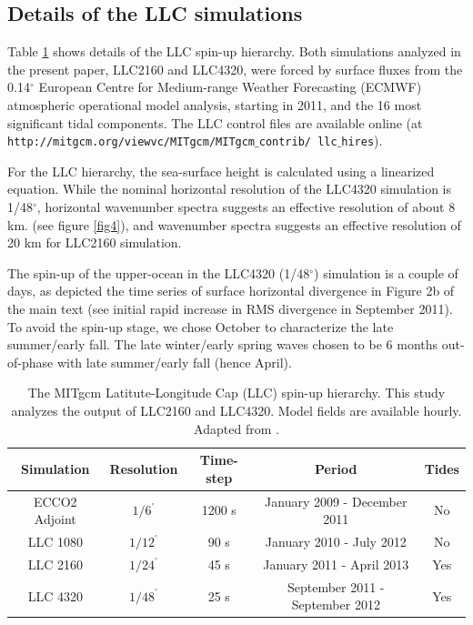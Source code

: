 \documentclass[grl]{agutex2015}
\begin{document}
\begin{article}







\newpage
\section*{Details of the LLC simulations}

Table \ref{tab:llc} shows details of the LLC spin-up hierarchy.
Both simulations analyzed in the present paper, LLC2160 and LLC4320,
were forced by surface fluxes from the 0.14$^\circ$ European Centre for
Medium-range Weather Forecasting (ECMWF) atmospheric operational model analysis,
 starting in 2011, and the 16 most significant  tidal components.
The LLC control files are available online
(at \texttt{http://mitgcm.org/viewvc/MITgcm/MITgcm$\_$contrib/
llc$\_$hires}).

For the LLC hierarchy, the sea-surface height is calculated
using a linearized equation. While the nominal horizontal resolution  of the
LLC4320 simulation is 1/48$^\circ$,
horizontal wavenumber spectra suggests an effective resolution of about 8 km.
(see figure \ref{fig4}), and wavenumber spectra suggests an effective resolution
of 20 km for  LLC2160 simulation.

The spin-up of the upper-ocean in the LLC4320 (1/48$^\circ$) simulation is
a couple of days, as depicted the time series of surface horizontal divergence
in Figure 2b of the main text (see initial rapid increase in RMS divergence in
September 2011). To avoid the spin-up stage, we chose October to characterize the
late summer/early fall. The late winter/early spring waves chosen to be 6 months
out-of-phase with late summer/early fall (hence April).

\begin{table}[ht]
\label{tab:llc}
\caption{\small The MITgcm Latitute-Longitude Cap (LLC) spin-up hierarchy. This study analyzes
         the output of LLC2160 and LLC4320. Model fields are available hourly.
         Adapted from \cite{rocha_etal2016}.}
\begin{center}
\begin{tabular}{ | c | c | c | c | c |}
\hline
Simulation & Resolution & Time-step & Period  & Tides \\ \hline
ECCO2 Adjoint & $1/6^{^\circ}$ & 1200 s & January 2009 - December 2011 & No\\
LLC 1080   & $1/12^{^\circ}$ & 90 s & January 2010 - July 2012 & No\\
LLC 2160   &  $1/24^{^\circ}$ & 45 s  & January 2011 - April 2013 & Yes\\
LLC 4320   &  $1/48^{^\circ}$ & 25 s & September 2011 - September 2012 & Yes \\
\hline
\end{tabular}
\end{center}
\end{table}


\end{article}
\end{document}
